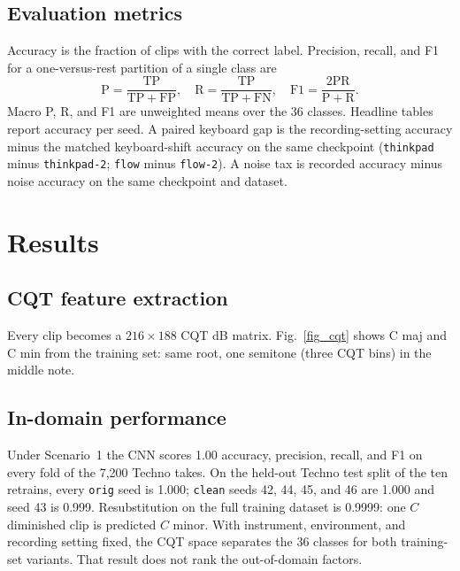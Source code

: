\documentclass[pdflatex,sn-mathphys-num,iicol]{sn-jnl}
\begin{document}
\subsection{Evaluation metrics}\label{subsec_metrics}

Accuracy is the fraction of clips with the correct label. Precision, recall, and F1 for a one-versus-rest partition of a single class are
\begin{equation}
\mathrm{P}=\frac{\mathrm{TP}}{\mathrm{TP}+\mathrm{FP}},\quad
\mathrm{R}=\frac{\mathrm{TP}}{\mathrm{TP}+\mathrm{FN}},\quad
\mathrm{F1}=\frac{2\mathrm{PR}}{\mathrm{P}+\mathrm{R}}.
\label{eq_prf}
\end{equation}
Macro P, R, and F1 are unweighted means over the 36 classes. Headline tables report accuracy per seed. A paired keyboard gap is the recording-setting accuracy minus the matched keyboard-shift accuracy on the same checkpoint (\texttt{thinkpad} minus \texttt{thinkpad-2}; \texttt{flow} minus \texttt{flow-2}). A noise tax is recorded accuracy minus noise accuracy on the same checkpoint and dataset.

\section{Results}\label{sec_results}

\subsection{CQT feature extraction}\label{subsec_res_cqt}

Every clip becomes a $216 \times 188$ CQT dB matrix. Fig.~\ref{fig_cqt} shows C maj and C min from the training set: same root, one semitone (three CQT bins) in the middle note.

\subsection{In-domain performance}\label{subsec_res_indomain}

Under Scenario~1 the CNN scores 1.00 accuracy, precision, recall, and F1 on every fold of the 7{,}200 Techno takes. On the held-out Techno test split of the ten retrains, every \texttt{orig} seed is 1.000; \texttt{clean} seeds 42, 44, 45, and 46 are 1.000 and seed 43 is 0.999. Resubstitution on the full training dataset is 0.9999: one $C$ diminished clip is predicted $C$ minor. With instrument, environment, and recording setting fixed, the CQT space separates the 36 classes for both training-set variants. That result does not rank the out-of-domain factors.
\end{document}
